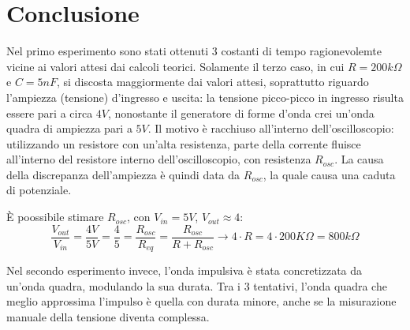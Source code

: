     \newpage
    \section{Conclusione}
    Nel primo esperimento sono stati ottenuti 3 costanti di tempo ragionevolemte vicine ai valori
    attesi dai calcoli teorici. Solamente il terzo caso, in cui $R = 200k\Omega$ e $C = 5nF$, si discosta maggiormente
    dai valori attesi, soprattutto riguardo l'ampiezza (tensione) d'ingresso e uscita: la tensione picco-picco
    in ingresso risulta essere pari a circa $4 V$, nonostante il generatore di forme d'onda crei un'onda quadra di ampiezza
    pari a $5V$. Il motivo è racchiuso all'interno dell'oscilloscopio: utilizzando un resistore con un'alta resistenza,
    parte della corrente fluisce all'interno del resistore interno dell'oscilloscopio, con resistenza $R_{osc}$.
    La causa della discrepanza dell'ampiezza è quindi data da $R_{osc}$, la quale causa una caduta di potenziale.\par
    È poossibile stimare $R_{osc}$, con $V_{in} = 5V$, $V_{out} \approx 4$: 
    \begin{equation}
        \frac{V_{out}}{V_{in}} = \frac{4V}{5V} = \frac{4}{5} = \frac{R_{osc}}{R_{eq}} = \frac{R_{osc}}{R + R_{osc}} \longrightarrow
        4 \cdot R = 4 \cdot 200K\Omega = 800 k\Omega
    \end{equation}
    \par
    Nel secondo esperimento invece, l'onda impulsiva è stata concretizzata da un'onda quadra, modulando la sua durata.
    Tra i 3 tentativi, l'onda quadra che meglio approssima l'impulso è quella con durata minore, anche se la misurazione manuale
    della tensione diventa complessa.
    

